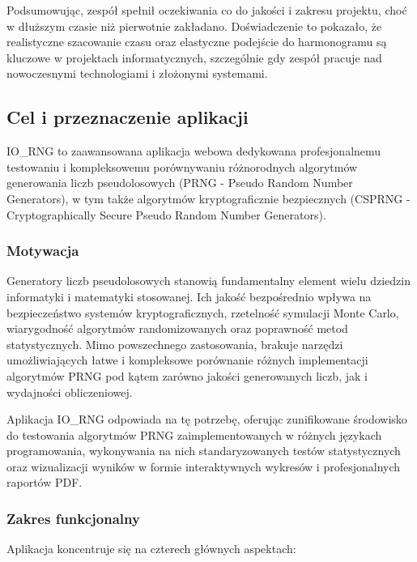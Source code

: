 \documentclass[12pt,a4paper]{article}
\begin{document}
Podsumowując, zespół spełnił oczekiwania co do jakości i zakresu projektu, choć w dłuższym czasie niż pierwotnie zakładano. Doświadczenie to pokazało, że realistyczne szacowanie czasu oraz elastyczne podejście do harmonogramu są kluczowe w projektach informatycznych, szczególnie gdy zespół pracuje nad nowoczesnymi technologiami i złożonymi systemami.



\subsection{Cel i przeznaczenie aplikacji}

IO\_RNG to zaawansowana aplikacja webowa dedykowana profesjonalnemu testowaniu i kompleksowemu porównywaniu różnorodnych algorytmów generowania liczb pseudolosowych (PRNG - Pseudo Random Number Generators), w tym także algorytmów kryptograficznie bezpiecznych (CSPRNG - Cryptographically Secure Pseudo Random Number Generators).

\subsubsection{Motywacja}

Generatory liczb pseudolosowych stanowią fundamentalny element wielu dziedzin informatyki i matematyki stosowanej. Ich jakość bezpośrednio wpływa na bezpieczeństwo systemów kryptograficznych, rzetelność symulacji Monte Carlo, wiarygodność algorytmów randomizowanych oraz poprawność metod statystycznych. Mimo powszechnego zastosowania, brakuje narzędzi umożliwiających łatwe i kompleksowe porównanie różnych implementacji algorytmów PRNG pod kątem zarówno jakości generowanych liczb, jak i wydajności obliczeniowej.

Aplikacja IO\_RNG odpowiada na tę potrzebę, oferując zunifikowane środowisko do testowania algorytmów PRNG zaimplementowanych w różnych językach programowania, wykonywania na nich standaryzowanych testów statystycznych oraz wizualizacji wyników w formie interaktywnych wykresów i profesjonalnych raportów PDF.

\subsubsection{Zakres funkcjonalny}

Aplikacja koncentruje się na czterech głównych aspektach:
\end{document}
